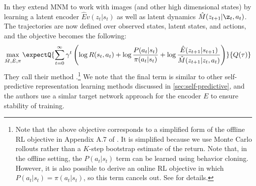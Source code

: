 {In \citep{Ghugare2022}
they extend MNM to work with images (and other high dimensional states)
by learning a latent encoder $\hat{E}v(z_t|s_t)$
as well as latent dynamics $\hat{M}(z_{t+1}|\z_t,a_t)$.
The trajectories are now defined over observed states, latent states,
and actions, and the objective becomes the following:
\begin{equation*}
  \max_{\hat{M},\hat{E},\pi}
  \expectQ{\sum_{t=0}^{\infty} \gamma^t\left(
    \log R(s_t,a_t) + \log \frac{P(a_t|s_t)}{\pi(a_t|s_t)}
    + \log \frac{\hat{E}(z_{t+1}|s_{t+1})}{\hat{M}(z_{t+1}|z_t,a_t)}\right)
    }{Q(\tau)}
\end{equation*}
They call their method
.\footnote{
%
Note that the above objective corresponds to a simplified
form of the offline RL
objective in Appendix A.7 of \citep{Ghugare2022}.
It is simplified because we  use Monte Carlo rollouts
rather than a $K$-step bootstrap estimate of the return.
Note that,
in the offline setting, the $P(a_t|s_t)$ term can be learned using  behavior cloning.
However, it is also possible to derive an online RL objective
in which $P(a_t|s_t) = \pi(a_t|s_t)$, so this term cancels out.
See \citep{Ghugare2022} for details.
}
We note that the final term is similar to
other self-predictive representation learning 
methods discussed in \cref{sec:self-predictive},
and the authors use a simlar target network approach for the
encoder $E$ to ensure stability of training.

}




